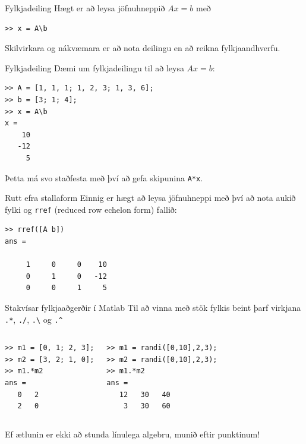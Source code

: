\documentclass[handout]{beamer}
\begin{document}
\begin{frame}[fragile]{Fylkjadeiling}
Hægt er að leysa jöfnuhneppið $A x = b$ með

\begin{verbatim}
>> x = A\b
\end{verbatim}

Skilvirkara og nákvæmara er að nota deilingu en að reikna fylkjaandhverfu.
\end{frame}

\begin{frame}[fragile]{Fylkjadeiling}
Dæmi um fylkjadeilingu til að leysa $A x = b$:
\begin{verbatim}
>> A = [1, 1, 1; 1, 2, 3; 1, 3, 6];
>> b = [3; 1; 4];
>> x = A\b
x =
    10
   -12
     5
\end{verbatim}
Þetta má svo staðfesta með því að gefa skipunina \texttt{A*x}.

\end{frame}

\begin{frame}[fragile]{Rutt efra stallaform}
Einnig er hægt að leysa jöfnuhneppi með því að nota aukið fylki og \texttt{rref} (reduced row echelon form) fallið:

\begin{verbatim}
>> rref([A b])
ans =

     1     0     0    10
     0     1     0   -12
     0     0     1     5
\end{verbatim}

\end{frame}



\begin{frame}[fragile]{Stakvísar fylkjaaðgerðir í Matlab}
\vspace{\baselineskip}
Til að vinna með stök fylkis beint þarf virkjana \texttt{.*}, \texttt{./}, \texttt{.\textbackslash} og \texttt{.\^}
\begin{columns}
\begin{verbatim}
>> m1 = [0, 1; 2, 3];
>> m2 = [3, 2; 1, 0];
>> m1.*m2
ans =
   0   2
   2   0
\end{verbatim}
\begin{verbatim}
>> m1 = randi([0,10],2,3);
>> m2 = randi([0,10],2,3);
>> m1.*m2
ans =
   12   30   40
    3   30   60
\end{verbatim}
\end{columns}
\vspace{\baselineskip}
Ef ætlunin er ekki að stunda línulega algebru, munið eftir punktinum!
\end{frame}
\end{document}
